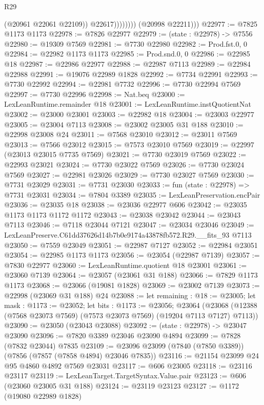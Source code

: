 \begin{lexlean}{R29}
\begin{coremodule}
                          (@20961 @22061 @22109))
                        @22617))))))))
        (@20998 @22211)))
@22977 := @7825 @1173 @1173
@22978 := @7826 @22977
@22979 := (state : @22978) -> @7556
@22980 := @19309 @7569
@22981 := @7730 @22980
@22982 := Prod.fst.{0, 0}
@22984 := @22982 @1173 @1173
@22985 := Prod.snd.{0, 0}
@22986 := @22985 @18
@22987 := @22986 @22977
@22988 := @22987 @7113
@22989 := @22984 @22988
@22991 := @19076 @22989 @1828
@22992 := @7734 @22991
@22993 := @7730 @22992
@22994 := @22981 @7732
@22996 := @7730 @22994 @7569
@22997 := @7730 @22996
@22998 := Nat.beq
@23000 := LexLeanRuntime.remainder @18
@23001 := LexLeanRuntime.instQuotientNat
@23002 := @23000 @23001
@23003 := @22982 @18
@23004 := @23003 @22977
@23005 := @23004 @7113
@23008 := @23002 @23005 @31 @188
@23010 := @22998 @23008 @24
@23011 := @7568 @23010
@23012 := @23011 @7569
@23013 := @7566 @23012
@23015 := @7573 @23010 @7569
@23019 := @22997 (@23013 @23015 @7735 @7569)
@23021 := @7730 @23019 @7569
@23022 := @22993 @23021
@23024 := @7730 @23022 @7569
@23026 := @7730 @23024 @7569
@23027 := @22981 @23026
@23029 := @7730 @23027 @7569
@23030 := @7731 @23029
@23031 := @7731 @23030
@23033 := fun (state : @22978) => @7731 @23031
@23034 := @7804 @3389
@23035 := LexLeanPreservation.encPair
@23036 := @23035 @18
@23038 := @23036 @22977 @606
@23042 := @23035 @1173 @1173 @1172 @1172
@23043 := @23038 @23042
@23044 := @23043 @7113
@23046 := @7118 @23044 @7121
@23047 := @23034 @23046
@23049 := LexLeanPreserve.C61dd37626d14b7b0e9174a43878fb572.R29.__fits_93 @7113
@23050 := @7559 @23049
@23051 := @22987 @7127
@23052 := @22984 @23051
@23054 := @22985 @1173 @1173
@23056 := @23054 (@22987 @7139)
@23057 := @7830 @22977
@23060 := LexLeanRuntime.quotient @18 @23001
@23061 := @23060 @7139
@23064 := @23057 (@23061 @31 @188)
@23066 := @7829 @1173 @1173
@23068 := @23066 (@19081 @1828)
@23069 := @23002 @7139
@23073 := @22998 (@23069 @31 @188) @24
@23088 := let remaining : @18 := @23005;
  let mask : @1173 := @23052;
  let bits : @1173 := @23056;
  @23064 (@23068 (@12388 (@7568 @23073 @7569) (@7573 @23073 @7569) (@19204 @7113 @7127) @7113))
@23090 := @23050 (@23043 @23088)
@23092 := (state : @22978) -> @23047 @23090
@23096 := @7820 @3389 @23046 @23090 @4894
@23099 := @7828 (@7832 @23044) @7835
@23109 := @23096 @23099 (@7840 (@7850 @3389)) (@7856 (@7857 (@7858 @4894) @23046 @7835))
@23116 := @21154 @23099 @24 @95 @4860 @4892 @7569 @23031
@23117 := @606 @23005
@23118 := @23116 @23117
@23119 := LexLeanTarget.TargetSyntax.Value.pair
@23123 := @606 (@23060 @23005 @31 @188)
@23124 := @23119 @23123
@23127 := @1172 (@19080 @22989 @1828)

\end{coremodule}
\end{lexlean}
